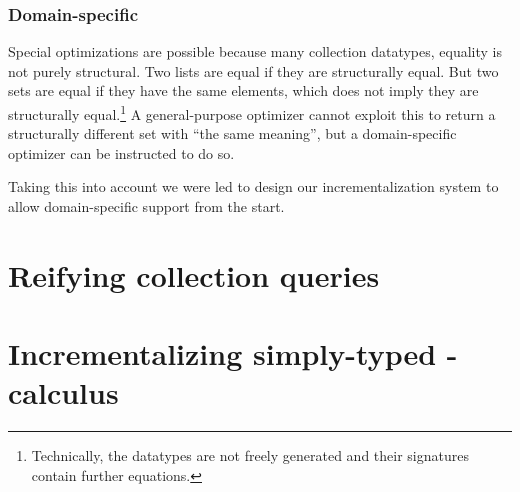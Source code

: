 \documentclass{book}
\begin{document}
\subsection{Domain-specific}
Special optimizations are possible because many collection datatypes, equality
is not purely structural. Two lists are equal if they are structurally equal.
But two sets are equal if they have the same elements, which does not imply they
are structurally equal.\footnote{
  Technically, the datatypes are not freely generated and their signatures
  contain further equations.}
%
A general-purpose optimizer cannot exploit this to return a structurally
different set with ``the same meaning'', but a domain-specific optimizer can be
instructed to do so.

Taking this into account we were led to design our incrementalization system to
allow domain-specific support from the start.

\chapter{Reifying collection queries}





\newcommand{\co}[1]{\code{#1}} %
\chapter{Incrementalizing simply-typed \TitleLambda{}-calculus}
















\begin{oldSec}

\end{oldSec}

\begin{oldSec}

\end{oldSec}




\end{document}
